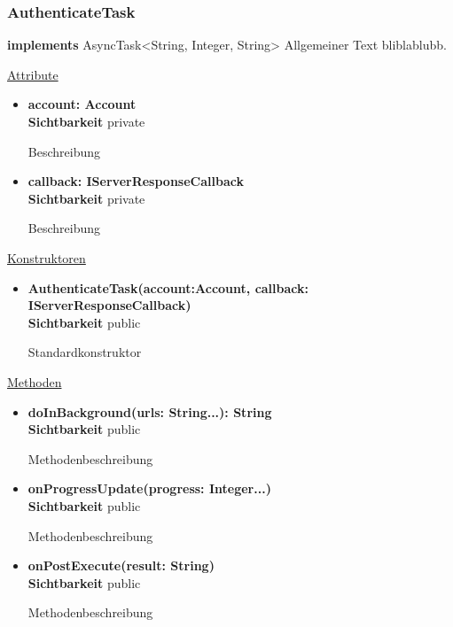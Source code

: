 \subsubsection{AuthenticateTask} \label{app:klasse:AuthenticateTask}
\textbf{implements} AsyncTask<String, Integer, String> \newline
Allgemeiner Text bliblablubb. \newline

\underline{Attribute}
\begin{itemize}
\itemsep0pt
\item \textbf{account: Account} \hfill\\ 
\textbf{Sichtbarkeit} private

Beschreibung

\item \textbf{callback: IServerResponseCallback} \hfill\\ 
\textbf{Sichtbarkeit} private

Beschreibung
\end{itemize}

\underline{Konstruktoren}
\begin{itemize}
\itemsep0pt
\item \textbf{AuthenticateTask(account:Account, callback: IServerResponseCallback)} \hfill\\
\textbf{Sichtbarkeit} public

Standardkonstruktor
\end{itemize}

\underline{Methoden}
\begin{itemize}
\itemsep0pt
\item \textbf{doInBackground(urls: String...): String}\hfill\\
\textbf{Sichtbarkeit} public

Methodenbeschreibung

\item \textbf{onProgressUpdate(progress: Integer...)}\hfill\\
\textbf{Sichtbarkeit} public

Methodenbeschreibung

\item \textbf{onPostExecute(result: String)}\hfill\\
\textbf{Sichtbarkeit} public

Methodenbeschreibung
\end{itemize}